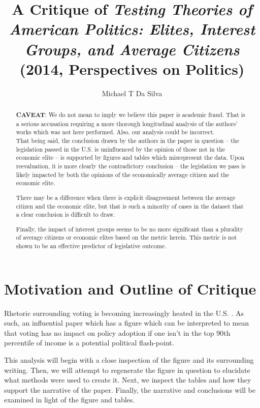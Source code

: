 \documentclass[]{article}
\title{A Critique of \textit{Testing Theories of American Politics: Elites, Interest Groups, and Average Citizens} (2014, Perspectives on Politics)}
\author{Michael T Da Silva}
\begin{document}
\maketitle

\begin{abstract}
	\textbf{CAVEAT}: We do not mean to imply we believe this paper is academic fraud. That is a serious accusation requiring a more thorough longitudinal analysis of the authors' works which was not here performed. Also, our analysis could be incorrect.\\
	
	That being said, the conclusion drawn by the authors in the paper in question -- the legislation passed in the U.S. is uninfluenced by the opinion of those not in the economic elite -- is supported by figures and tables which misrepresent the data. Upon reevaluation, it is more clearly the contradictory conclusion -- the legislation we pass is likely impacted by both the opinions of the economically average citizen and the economic elite. 
	
	There may be a difference when there is explicit disagreement between the average citizen and the economic elite, but that is such a minority of cases in the dataset that a clear conclusion is difficult to draw.
	
	Finally, the impact of interest groups seems to be no more significant than a plurality of average citizens or economic elites based on the metric herein. This metric is not shown to be an effective predictor of legislative outcome.

\end{abstract}

\section{Motivation and Outline of Critique}
Rhetoric surrounding voting is becoming increasingly heated in the U.S. \cite{voting_rights}. 
As such, an influential paper which has a figure which can be interpreted to mean that voting has no impact on policy adoption if one isn't in the top 90th percentile of income is a potential political flash-point.

This analysis will begin with a close inspection of the figure and its surrounding writing.
Then, we will attempt to regenerate the figure in question to elucidate what methods were used to create it.
Next, we inspect the tables and how they support the narrative of the paper.
Finally, the narrative and conclusions will be examined in light of the figure and tables.\\
\end{document}
